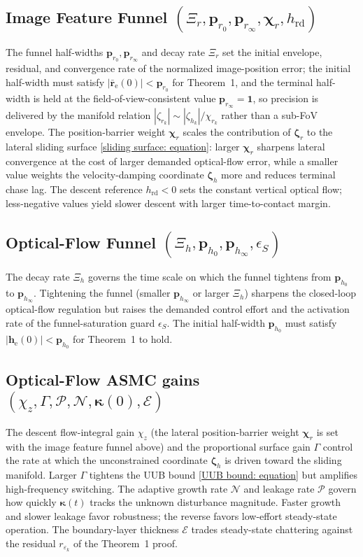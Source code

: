 \documentclass{IEEEtaes}
\begin{document}
\subsection{Image Feature Funnel $(\Xi_r, \boldsymbol{p}_{r_0}, \boldsymbol{p}_{r_\infty}, \boldsymbol{\chi}_r, h_\text{rd})$} The funnel half-widths $\boldsymbol{p}_{r_0}, \boldsymbol{p}_{r_\infty}$ and decay rate $\Xi_r$ set the initial envelope, residual, and convergence rate of the normalized image-position error; the initial half-width must satisfy $|\bar{\boldsymbol{r}}_\text{e}(0)|<\boldsymbol{p}_{r_0}$ for Theorem~1, and the terminal half-width is held at the field-of-view-consistent value $\boldsymbol{p}_{r_\infty}=\boldsymbol{1}$, so precision is delivered by the manifold relation $|\zeta_{r_k}|\sim|\zeta_{h_k}|/\chi_{r_k}$ rather than a sub-FoV envelope. The position-barrier weight $\boldsymbol{\chi}_r$ scales the contribution of $\boldsymbol{\zeta}_r$ to the lateral sliding surface \eqref{sliding surface: equation}: larger $\boldsymbol{\chi}_r$ sharpens lateral convergence at the cost of larger demanded optical-flow error, while a smaller value weights the velocity-damping coordinate $\boldsymbol{\zeta}_h$ more and reduces terminal chase lag. The descent reference $h_\text{rd}<0$ sets the constant vertical optical flow; less-negative values yield slower descent with larger time-to-contact margin.

\subsection{Optical-Flow Funnel $(\Xi_h, \boldsymbol{p}_{h_0}, \boldsymbol{p}_{h_\infty}, \epsilon_S)$} The decay rate $\Xi_h$ governs the time scale on which the funnel tightens from $\boldsymbol{p}_{h_0}$ to $\boldsymbol{p}_{h_\infty}$. Tightening the funnel (smaller $\boldsymbol{p}_{h_\infty}$ or larger $\Xi_h$) sharpens the closed-loop optical-flow regulation but raises the demanded control effort and the activation rate of the funnel-saturation guard $\epsilon_S$. The initial half-width $\boldsymbol{p}_{h_0}$ must satisfy $|\boldsymbol{h}_\text{e}(0)|<\boldsymbol{p}_{h_0}$ for Theorem~1 to hold.

\subsection{Optical-Flow ASMC gains $(\chi_z, \Gamma, \mathcal{P}, \mathcal{N}, \boldsymbol{\kappa}(0), \mathcal{E})$} The descent flow-integral gain $\chi_z$ (the lateral position-barrier weight $\boldsymbol{\chi}_r$ is set with the image feature funnel above) and the proportional surface gain $\Gamma$ control the rate at which the unconstrained coordinate $\boldsymbol{\zeta}_h$ is driven toward the sliding manifold. Larger $\Gamma$ tightens the UUB bound \eqref{UUB bound: equation} but amplifies high-frequency switching. The adaptive growth rate $\mathcal{N}$ and leakage rate $\mathcal{P}$ govern how quickly $\boldsymbol{\kappa}(t)$ tracks the unknown disturbance magnitude. Faster growth and slower leakage favor robustness; the reverse favors low-effort steady-state operation. The boundary-layer thickness $\mathcal{E}$ trades steady-state chattering against the residual $r_{\varepsilon_k}$ of the Theorem~1 proof.
\end{document}
